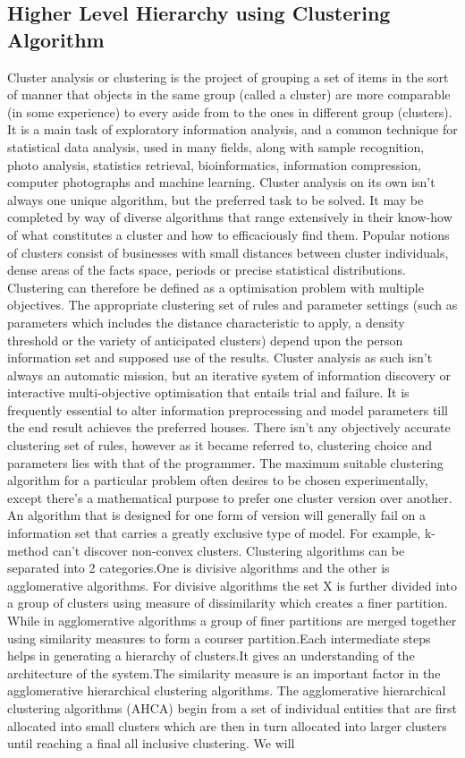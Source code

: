 \documentclass[12pt]{article}
\begin{document}
\subsection{Higher Level Hierarchy using Clustering Algorithm}
Cluster analysis or clustering is the project of grouping a set of items in the sort of manner that objects in the same group (called a cluster) are more comparable (in some experience) to every aside from to the ones in different group (clusters). It is a main task of exploratory information analysis, and a common technique for statistical data analysis, used in many fields, along with sample recognition, photo analysis, statistics retrieval, bioinformatics, information compression, computer photographs and machine learning. Cluster analysis on its own isn’t always one unique algorithm, but the preferred task to be solved. It may be completed by way of diverse algorithms that range extensively in their know-how of what constitutes a cluster and how to efficaciously find them. Popular notions of clusters consist of businesses with small distances between cluster individuals, dense areas of the facts space, periods or precise statistical distributions. Clustering can therefore be defined as a optimisation problem with multiple objectives. The appropriate clustering set of rules and parameter settings (such as parameters which includes the distance characteristic to apply, a density threshold or the variety of anticipated clusters) depend upon the person information set and supposed use of the results. Cluster analysis as such isn’t always an automatic mission, but an iterative system of information discovery or interactive multi-objective optimisation that entails trial and failure. It is frequently essential to alter information preprocessing and model parameters till the end result achieves the preferred houses. There isn’t any objectively accurate clustering set of rules, however as it became referred to, clustering choice and parameters lies with that of the programmer. The maximum suitable clustering algorithm for a particular problem often desires to be chosen experimentally, except there’s a mathematical purpose to prefer one cluster version over another. An algorithm that is designed for one form of version will generally fail on a information set that carries a greatly exclusive type of model. For example, k-method can’t discover non-convex clusters. Clustering algorithms can be separated into 2 categories.One is divisive algorithms and the other is agglomerative algorithms. For divisive algorithms the set X is further divided into a group of clusters using measure of dissimilarity which creates a finer partition. While in agglomerative algorithms a group of finer partitions are merged together using similarity measures to form a courser partition.Each intermediate steps helps in generating a hierarchy of clusters.It gives an understanding of the architecture of the system.The similarity measure is an important factor in the agglomerative hierarchical clustering algorithms. The agglomerative hierarchical clustering algorithms (AHCA) begin from a set of individual entities that are first allocated into small clusters which are then in turn allocated into larger clusters until reaching a final all inclusive clustering. We will 
\end{document}
